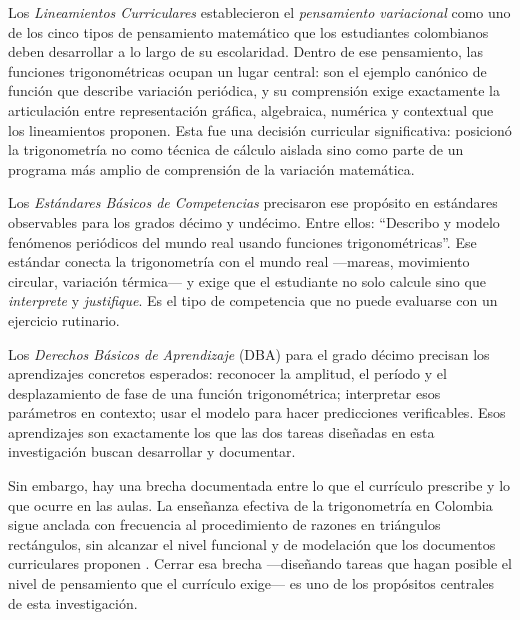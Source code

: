 Los \emph{Lineamientos Curriculares} \parencite{ministeriodeeducacionnacionalLineamientosCurriculares1998} establecieron el \emph{pensamiento variacional} como uno de los cinco tipos de pensamiento matemático que los estudiantes colombianos deben desarrollar a lo largo de su escolaridad. Dentro de ese pensamiento, las funciones trigonométricas ocupan un lugar central: son el ejemplo canónico de función que describe variación periódica, y su comprensión exige exactamente la articulación entre representación gráfica, algebraica, numérica y contextual que los lineamientos proponen. Esta fue una decisión curricular significativa: posicionó la trigonometría no como técnica de cálculo aislada sino como parte de un programa más amplio de comprensión de la variación matemática.

Los \emph{Estándares Básicos de Competencias} \parencite{ministeriodeeducacionnacionalEstandaresBasicos2006} precisaron ese propósito en estándares observables para los grados décimo y undécimo. Entre ellos: ``Describo y modelo fenómenos periódicos del mundo real usando funciones trigonométricas''. Ese estándar conecta la trigonometría con el mundo real —mareas, movimiento circular, variación térmica— y exige que el estudiante no solo calcule sino que \emph{interprete} y \emph{justifique}. Es el tipo de competencia que no puede evaluarse con un ejercicio rutinario.

Los \emph{Derechos Básicos de Aprendizaje} (DBA) \parencite{ministeriodeeducacionnacionalDerechosBasicos2016} para el grado décimo precisan los aprendizajes concretos esperados: reconocer la amplitud, el período y el desplazamiento de fase de una función trigonométrica; interpretar esos parámetros en contexto; usar el modelo para hacer predicciones verificables. Esos aprendizajes son exactamente los que las dos tareas diseñadas en esta investigación buscan desarrollar y documentar.

Sin embargo, hay una brecha documentada entre lo que el currículo prescribe y lo que ocurre en las aulas. La enseñanza efectiva de la trigonometría en Colombia sigue anclada con frecuencia al procedimiento de razones en triángulos rectángulos, sin alcanzar el nivel funcional y de modelación que los documentos curriculares proponen \parencite{montiel-espinosaDesarrolloPensamientoTrigonometrico2013}. Cerrar esa brecha —diseñando tareas que hagan posible el nivel de pensamiento que el currículo exige— es uno de los propósitos centrales de esta investigación.


